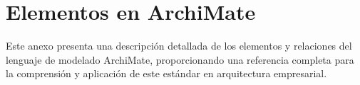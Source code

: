 \pagestyle{anexos}

\anexos

\FloatBarrier
\chapter{Elementos en ArchiMate}\label{anexo:archimate-elementos}

Este anexo presenta una descripción detallada de los elementos y relaciones del lenguaje de modelado ArchiMate, proporcionando una referencia completa para la comprensión y aplicación de este estándar en arquitectura empresarial.



\FloatBarrier
% 


